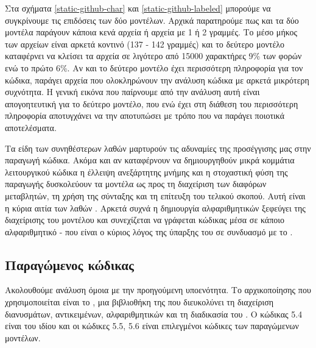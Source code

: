 Στα σχήματα \ref{static-github-char} και \ref{static-github-labeled} μπορούμε να συγκρίνουμε τις επιδόσεις των δύο μοντέλων.
Αρχικά παρατηρούμε πως και τα δύο μοντέλα παράγουν κάποια κενά αρχεία ή αρχεία με 1 ή 2 γραμμές.
Το μέσο μήκος των αρχείων είναι αρκετά κοντινό (137 - 142 γραμμές) και το δεύτερο μοντέλο καταφέρνει να κλείσει τα αρχεία σε λιγότερο από 15000 χαρακτήρες 9\% των φορών ενώ το πρώτο 6\%.
Αν και το δεύτερο μοντέλο έχει περισσότερη πληροφορία για τον κώδικα, παράγει αρχεία που ολοκληρώνουν την ανάλυση κώδικα με αρκετά μικρότερη συχνότητα.
Η γενική εικόνα που παίρνουμε από την ανάλυση αυτή είναι απογοητευτική για το δεύτερο μοντέλο, που ενώ έχει στη διάθεση του περισσότερη πληροφορία αποτυγχάνει να την αποτυπώσει με τρόπο που να παράγει ποιοτικά αποτελέσματα.

Τα είδη των συνηθέστερων λαθών μαρτυρούν τις αδυναμίες της προσέγγισης μας στην παραγωγή κώδικα.
Ακόμα και αν καταφέρνουν να δημιουργηθούν μικρά κομμάτια λειτουργικού κώδικα η έλλειψη ανεξάρτητης μνήμης και η στοχαστική φύση της παραγωγής δυσκολεύουν τα μοντέλα ως προς τη διαχείριση των διαφόρων μεταβλητών, τη χρήση της σύνταξης και τη επίτευξη του τελικού σκοπού.
Αυτή είναι η κύρια αιτία των λαθών .
Αρκετά συχνά η δημιουργία αλφαριθμητικών ξεφεύγει της διαχείρισης του μοντέλου και συνεχίζεται να γράφεται κώδικας μέσα σε κάποιο αλφαριθμητικό - που είναι ο κύριος λόγος της ύπαρξης του  σε συνδυασμό με το .

\subsection{ Παραγώμενος κώδικας}

Ακολουθούμε ανάλυση όμοια με την προηγούμενη υποενότητα.
Το  αρχικοποίησης που χρησιμοποιείται είναι το , μια βιβλιοθήκη της  που διευκολύνει τη διαχείριση διανυσμάτων, αντικειμένων, αλφαριθμητικών και τη διαδικασία του . Ο κώδικας 5.4 είναι του ιδίου  και οι κώδικες 5.5, 5.6 είναι επιλεγμένοι κώδικες των παραγώμενων μοντέλων. 
\pagebreak





